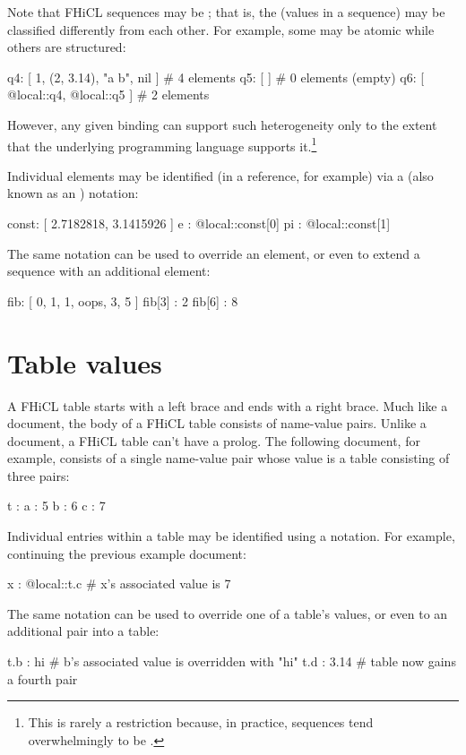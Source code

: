 \documentclass{memarticle}
\newcommand{\fhicl}%
 {FHiCL\xspace}
\begin{document}
Note that \fhicl sequences 
may be ;
that is,
the  (values in a sequence)
may be classified differently from each other.
For example,
some may be atomic while others are structured:
\Needspace{0.50in}
\begin{fcllisting}[texcl,escapechar=`]
q4: [ 1, (2, 3.14), "a b", nil ]  # 4 elements
q5: [ ]                           # 0 elements (empty)
q6: [ @local::q4, @local::q5 ]    # 2 elements
\end{fcllisting}
However, any given binding
can support such heterogeneity
only to the extent
that the underlying programming language supports it.\footnote{%
  This is rarely a restriction
  because, in practice,
  sequences tend overwhelmingly to be .%
}

Individual elements may be identified
(in a reference, for example)
via a  (also known as an ) notation:
\Needspace{0.50in}
\begin{fcllisting}[texcl,escapechar=`]
const: [ 2.7182818, 3.1415926 ]
e    : @local::const[0]
pi   : @local::const[1]
\end{fcllisting}
The same notation can be used to override an element,
or even to extend a sequence with an additional element:
\Needspace{0.50in}
\begin{fcllisting}[texcl,escapechar=`]
fib: [ 0, 1, 1, oops, 3, 5 ]
fib[3] : 2
fib[6] : 8
\end{fcllisting}

\section{Table values}

A \fhicl table starts with a left brace
and ends with a right brace.
Much like a document,
the body of a \fhicl table
consists of name-value pairs.
Unlike a document,
a \fhicl table can't have a prolog.
The following document,
for example,
consists of a single name-value pair
whose value is a table consisting of three pairs:
\Needspace{0.67in}
\begin{fcllisting}[texcl,escapechar=`]
t : {  a : 5
       b : 6
       c : 7
    }
\end{fcllisting}

Individual entries within a table
may be identified
using a  notation.
For example,
continuing the previous example document:
\Needspace{0.17in}
\begin{fcllisting}[texcl,escapechar=`]
x : @local::t.c  # x's associated value is 7
\end{fcllisting}
The same notation can be used to override one of a table's values,
or even to  an additional pair into a table:
\Needspace{0.34in}
\begin{fcllisting}[texcl,escapechar=`]
t.b : hi    # b's associated value is overridden with "hi"
t.d : 3.14  # table now gains a fourth pair
\end{fcllisting}
\end{document}
